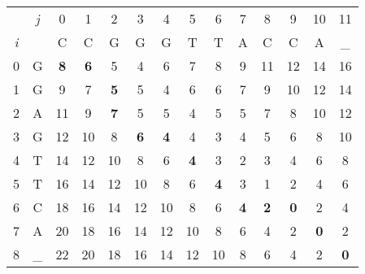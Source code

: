 \documentclass[aip, jmp, amsmath,amssymb, reprint]{revtex4-1}
\theoremstyle{definition}
\begin{document}
\begin{center}
\begin{tabular}{|cc|c|c|c|c|c|c|c|c|c|c|c|c|}
    \hline
    & \textit{j} & 0 & 1 & 2 & 3 & 4 & 5 & 6 & 7 & 8 & 9 & 10 & 11\\
    \textit{i}& & C & C & G & G & G & T & T & A & C & C & A & \_\\
    \hline
    0 & G & \textbf{8} & \textbf{6} & 5 & 4 & 6 & 7 & 8 & 9 & 11 & 12 & 14 & 16\\
    \hline
    1 & G & 9 & 7 & \textbf{5} & 5 & 4 & 6 & 6 & 7 & 9 & 10 & 12 & 14\\
    \hline
    2 & A & 11 & 9 & \textbf{7} & 5 & 5 & 4 & 5 & 5 & 7 & 8 & 10 & 12\\
    \hline
    3 & G & 12 & 10 & 8 & \textbf{6} & \textbf{4} & 4 & 3 & 4 & 5 & 6 & 8 & 10\\
    \hline
    4 & T & 14 & 12 & 10 & 8 & 6 & \textbf{4} & 3 & 2 & 3 & 4 & 6 & 8\\
    \hline
    5 & T & 16 & 14 & 12 & 10 & 8 & 6 & \textbf{4} & 3 & 1 & 2 & 4 & 6\\
    \hline
    6 & C & 18 & 16 & 14 & 12 & 10 & 8 & 6 & \textbf{4} & \textbf{2} & \textbf{0} & 2 & 4\\
    \hline
    7 & A & 20 & 18 & 16 & 14 & 12 & 10 & 8 & 6 & 4 & 2 & \textbf{0} & 2\\
    \hline
    8 & \_ & 22 & 20 & 18 & 16 & 14 & 12 & 10 & 8 & 6 & 4 & 2 & \textbf{0}\\
    \hline
\end{tabular}
\end{center}
\end{document}
